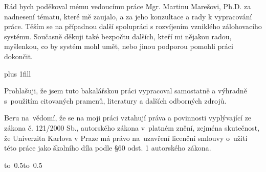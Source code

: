 \documentclass[12pt,a4paper]{report}
\let\openright=\clearpage
\begin{document}
\openright

\noindent
Rád bych poděkoval mému vedoucímu práce Mgr. Martinu Marešovi, Ph.D. za
nadnesení tématu, které mě zaujalo, a za jeho konzultace a rady k vypracování
práce. Těším se na případnou další spolupráci s rozvíjením vzniklého
zálohovacího systému. Současně děkuji také bezpočtu dalších, kteří mi nějakou
radou, myšlenkou, co by systém mohl umět, nebo jinou podporou pomohli práci
dokončit.

\newpage


\vglue 0pt plus 1fill

\noindent
Prohlašuji, že jsem tuto bakalářskou práci vypracoval samostatně a výhradně
s~použitím citovaných pramenů, literatury a dalších odborných zdrojů.

\medskip\noindent
Beru na~vědomí, že se na moji práci vztahují práva a povinnosti vyplývající
ze zákona č. 121/2000 Sb., autorského zákona v~platném znění, zejména skutečnost,
že Univerzita Karlova v Praze má právo na~uzavření licenční smlouvy o~užití této
práce jako školního díla podle §60 odst. 1 autorského zákona.

\vspace{10mm}

\hbox{\hbox to 0.5\hbox to 0.5\hsize{%
\hss}}

\vspace{20mm}
\newpage

\end{document}
